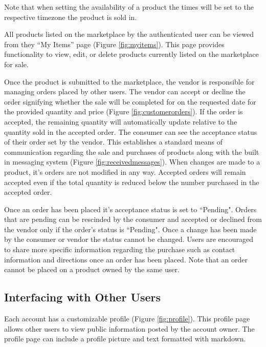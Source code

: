 \documentclass[letterpaper, 10 pt, conference]{ieeeconf}  %
\begin{document}
Note that when setting the availability of a product the times will be set to the respective timezone the product is sold in.

All products listed on the marketplace by the authenticated user can be viewed from they ``My Items'' page (Figure \ref{fig:myitems}). This page provides functionality to view, edit, or delete products currently listed on the marketplace for sale.

Once the product is submitted to the marketplace, the vendor is responsible for managing orders placed by other users. The vendor can accept or decline the order signifying whether the sale will be completed for on the requested date for the provided quantity and price (Figure \ref{fig:customerorders}). If the order is accepted, the remaining quantity will automatically update relative to the quantity sold in the accepted order. The consumer can see the acceptance status of their order set by the vendor. This establishes a standard means of communication regarding the sale and purchases of products along with the built in messaging system (Figure \ref{fig:receivedmessages}). When changes are made to a product, it's orders are not modified in any way. Accepted orders will remain accepted even if the total quantity is reduced below the number purchased in the accepted order.

Once an order has been placed it's acceptance status is set to ``Pending". Orders that are pending can be rescinded by the consumer and accepted or declined from the vendor only if the order's status is ``Pending". Once a change has been made by the consumer or vendor the status cannot be changed. Users are encouraged to share more specific information regarding the purchase such as contact information and directions once an order has been placed. Note that an order cannot be placed on a product owned by the same user.

\subsection{Interfacing with Other Users}

Each account has a customizable profile (Figure \ref{fig:profile}). This profile page allows other users to view public information posted by the account owner. The profile page can include a profile picture and text formatted with markdown.
\end{document}
